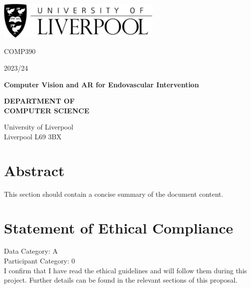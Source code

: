 \documentclass[12pt]{article}
\begin{document}
\newpage
\begin{titlepage}
    \centering


    \includegraphics[width=0.6\textwidth]{Liverpool.jpg} %
    \vspace*{1cm}

    \Large
    COMP390

    \large
    2023/24

    \vspace{4.5cm}
    \Huge
    \textbf{Computer Vision and AR for Endovascular Intervention}

    \vspace{1.5cm}



    \vspace{4cm} %
    \Large
    \textbf{DEPARTMENT OF}\\
    \vspace{0.1cm} %
    \textbf{COMPUTER SCIENCE}

    \vspace{1cm} %
    \large
    University of Liverpool\\
    Liverpool L69 3BX


\end{titlepage}
\tableofcontents
\newpage

\section*{Abstract}
This section should contain a concise summary of the document content.

\section*{Statement of Ethical Compliance}
\begin{mdframed}
    \Large %
Data Category: A \\
Participant Category: 0 \\
    \normalsize %
    I confirm that I have read the ethical guidelines and will follow them during this project. Further details can be found in the relevant sections of this proposal.
\end{mdframed}
\newpage
\end{document}
